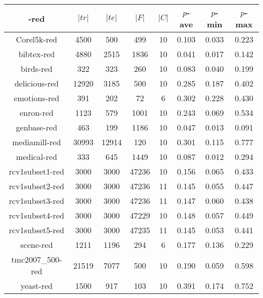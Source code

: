 \documentclass[10pt,a4paper]{article}
\begin{document}
\begin{table}[b]
\begin{tabular}{|c||c|c|c|c|c|c|c|}\hline
    -red & $|tr|$ & $|te|$ & $|F|$ & $|C|$ & $p$-ave & $p$-min & $p$-max \\\hline
Corel5k-red & 4500 & 500 & 499 & 10 & 0.103 & 0.033 & 0.223\\\hline
bibtex-red & 4880 & 2515 & 1836 & 10 & 0.041 & 0.017 & 0.142\\\hline
birds-red & 322 & 323 & 260 & 10 & 0.083 & 0.040 & 0.199\\\hline
delicious-red & 12920 & 3185 & 500 & 10 & 0.285 & 0.187 & 0.402\\\hline
emotions-red & 391 & 202 & 72 & 6 & 0.302 & 0.228 & 0.430\\\hline
enron-red & 1123 & 579 & 1001 & 10 & 0.243 & 0.069 & 0.534\\\hline
genbase-red & 463 & 199 & 1186 & 10 & 0.047 & 0.013 & 0.091\\\hline
mediamill-red & 30993 & 12914 & 120 & 10 & 0.301 & 0.115 & 0.777\\\hline
medical-red & 333 & 645 & 1449 & 10 & 0.087 & 0.012 & 0.294\\\hline
rcv1subset1-red & 3000 & 3000 & 47236 & 10 & 0.156 & 0.065 & 0.433\\\hline
rcv1subset2-red & 3000 & 3000 & 47236 & 11 & 0.145 & 0.055 & 0.447\\\hline
rcv1subset3-red & 3000 & 3000 & 47236 & 11 & 0.147 & 0.060 & 0.438\\\hline
rcv1subset4-red & 3000 & 3000 & 47229 & 10 & 0.148 & 0.057 & 0.449\\\hline
rcv1subset5-red & 3000 & 3000 & 47235 & 11 & 0.145 & 0.053 & 0.441\\\hline
scene-red & 1211 & 1196 & 294 & 6 & 0.177 & 0.136 & 0.229\\\hline
tmc2007\_500-red & 21519 & 7077 & 500 & 10 & 0.190 & 0.059 & 0.598\\\hline
yeast-red & 1500 & 917 & 103 & 10 & 0.391 & 0.174 & 0.752\\\hline
\end{tabular}
\end{table}


%
%        
%
%







\end{document}

